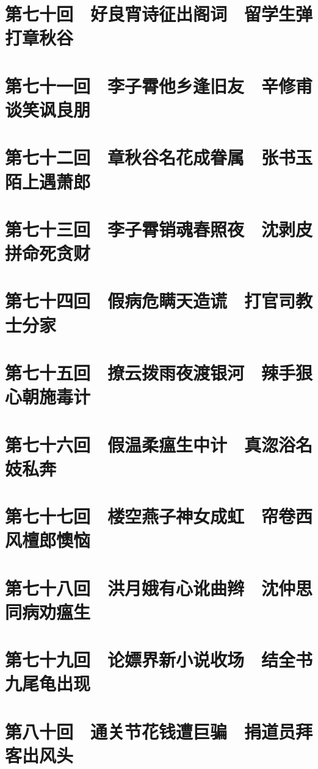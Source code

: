 \documentclass[12pt,UTF8]{ctexbook}
\begin{document}
\chapter{第七十回　好良宵诗征出阁词　留学生弹打章秋谷}

\chapter{第七十一回　李子霄他乡逢旧友　辛修甫谈笑讽良朋}

\chapter{第七十二回　章秋谷名花成眷属　张书玉陌上遇萧郎}

\chapter{第七十三回　李子霄销魂春照夜　沈剥皮拼命死贪财}

\chapter{第七十四回　假病危瞒天造谎　打官司教士分家}

\chapter{第七十五回　撩云拨雨夜渡银河　辣手狠心朝施毒计}

\chapter{第七十六回　假温柔瘟生中计　真淴浴名妓私奔}

\chapter{第七十七回　楼空燕子神女成虹　帘卷西风檀郎懊恼}

\chapter{第七十八回　洪月娥有心讹曲辫　沈仲思同病劝瘟生}

\chapter{第七十九回　论嫖界新小说收场　结全书九尾龟出现}

\chapter{第八十回　通关节花钱遭巨骗　捐道员拜客出风头}
\end{document}
